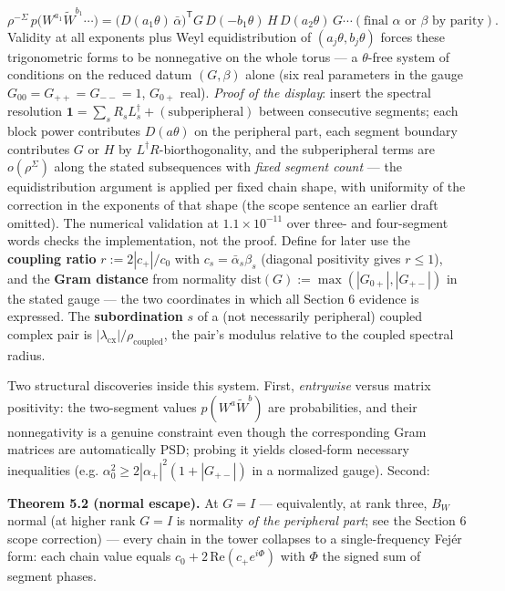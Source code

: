 \documentclass[11pt]{article}
\begin{document}
\[
\rho^{-\Sigma}\,p\bigl(W^{a_1}\widetilde W^{b_1}\cdots\bigr)
= \bigl(D(a_1\theta)\,\bar\alpha\bigr)^{\mathsf T} G\,
  D(-b_1\theta)\,H\,D(a_2\theta)\,G\cdots(\text{final }\alpha
  \text{ or }\beta\text{ by parity}).
\]
Validity at all exponents plus Weyl equidistribution of $(a_j\theta, b_j\theta)$ forces these trigonometric forms to be nonnegative on the whole torus — a $\theta$-free system of conditions on the reduced datum $(G, \beta)$ alone (six real parameters in the gauge $G_{00} = G_{++} = G_{--} = 1$, $G_{0+}$ real).  \emph{Proof of the display}: insert the spectral resolution $\mathbf 1 = \sum_s R_s L_s^\dagger + (\text{subperipheral})$ between consecutive segments; each block power contributes $D(a\theta)$ on the peripheral part, each segment boundary contributes $G$ or $H$ by $L^\dagger R$-biorthogonality, and the subperipheral terms are $o(\rho^\Sigma)$ along the stated subsequences with \emph{fixed segment count} — the equidistribution argument is applied per fixed chain shape, with uniformity of the correction in the exponents of that shape (the scope sentence an earlier draft omitted).  The numerical validation at $1.1\times 10^{-11}$ over three- and four-segment words checks the implementation, not the proof.  Define for later use the \textbf{coupling ratio} $r := 2|c_+|/c_0$ with $c_s = \bar\alpha_s\beta_s$ (diagonal positivity gives $r \le 1$), and the \textbf{Gram distance} from normality $\mathrm{dist}(G) := \max(|G_{0+}|, |G_{+-}|)$ in the stated gauge — the two coordinates in which all Section 6 evidence is expressed.  The \textbf{subordination} $s$ of a (not necessarily peripheral) coupled complex pair is $|\lambda_{\mathrm{cx}}|/\rho_{\mathrm{coupled}}$, the pair's modulus relative to the coupled spectral radius.

Two structural discoveries inside this system.  First, \emph{entrywise} versus matrix positivity: the two-segment values $p(W^a\widetilde W^b)$ are probabilities, and their nonnegativity is a genuine constraint even though the corresponding Gram matrices are automatically PSD; probing it yields closed-form necessary inequalities (e.g. $\alpha_0^2 \ge 2|\alpha_+|^2(1 + |G_{+-}|)$ in a normalized gauge).  Second:

\textbf{Theorem 5.2 (normal escape).}  At $G = I$ — equivalently, at rank three, $B_W$ normal (at higher rank $G = I$ is normality \emph{of the peripheral part}; see the Section 6 scope correction) — every chain in the tower collapses to a single-frequency Fejér form: each chain value equals $c_0 + 2\,\mathrm{Re}(c_+ e^{i\Phi})$ with $\Phi$ the signed sum of segment phases.
\end{document}
